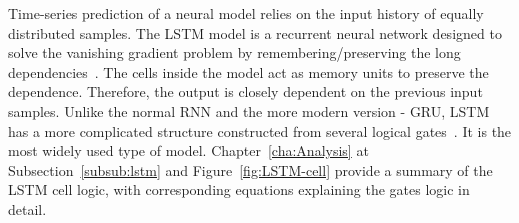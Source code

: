 Time-series prediction of a neural model relies on the input history of equally distributed samples.
The LSTM model is a recurrent neural network designed to solve the vanishing gradient problem by remembering/preserving the long dependencies~\cite{rasifaghihi_predictive_2020}.
The cells inside the model act as memory units to preserve the dependence.
Therefore, the output is closely dependent on the previous input samples.
Unlike the normal RNN and the more modern version - GRU, LSTM has a more complicated structure constructed from several logical gates~\cite{LSTM_Hochreiter1997}.
It is the most widely used type of model.
{
Chapter~\ref{cha:Analysis} at Subsection~\ref{subsub:lstm} and \mbox{Figure~\ref{fig:LSTM-cell}} provide a summary of the LSTM cell logic, with corresponding equations explaining the gates logic in detail.
} 
